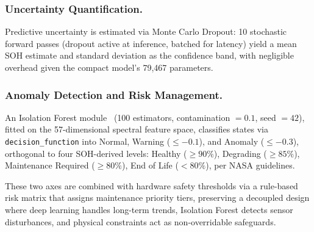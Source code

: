 \subsubsection{Uncertainty Quantification.}
Predictive uncertainty is estimated via Monte Carlo Dropout: 10 stochastic
forward passes (dropout active at inference, batched for latency) yield a mean
SOH estimate and standard deviation as the confidence band, with negligible
overhead given the compact model's 79{,}467 parameters.

\subsubsection{Anomaly Detection and Risk Management.}
An Isolation Forest module~\cite{liu2008} (100 estimators, contamination
$= 0.1$, seed $= 42$), fitted on the 57-dimensional spectral feature space,
classifies states via \texttt{decision\_function} into Normal, Warning
($\le -0.1$), and Anomaly ($\le -0.3$), orthogonal to four SOH-derived levels:
Healthy ($\ge 90\%$), Degrading ($\ge 85\%$), Maintenance Required
($\ge 80\%$), End of Life ($< 80\%$), per NASA guidelines.

These two axes are combined with hardware safety thresholds via a rule-based
risk matrix that assigns maintenance priority tiers, preserving a decoupled
design where deep learning handles long-term trends, Isolation Forest detects
sensor disturbances, and physical constraints act as non-overridable safeguards.
